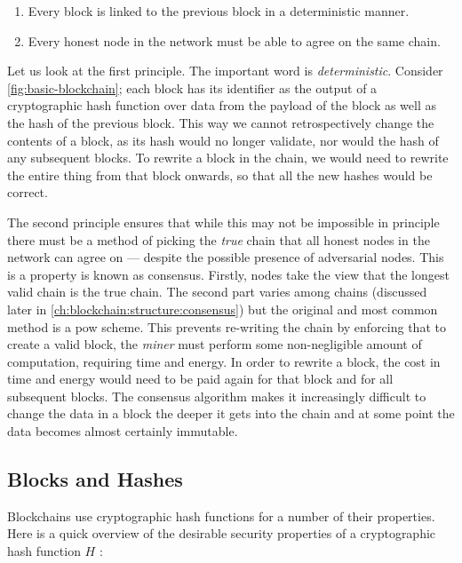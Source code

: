 \begin{enumerate}
    \item Every block is linked to the previous block in a deterministic manner.
    \item Every honest node in the network must be able to agree on the same chain.
\end{enumerate}

Let us look at the first principle. The important word is \emph{deterministic}. Consider \autoref{fig:basic-blockchain}; each block has its identifier as the output of a cryptographic hash function over data from the payload of the block as well as the hash of the previous block. This way we cannot retrospectively change the contents of a block, as its hash would no longer validate, nor would the hash of any subsequent blocks. To rewrite a block in the chain, we would need to rewrite the entire thing from that block onwards, so that all the new hashes would be correct.

The second principle ensures that while this may not be impossible in principle there must be a method of picking the \emph{true} chain that all honest nodes in the network can agree on --- despite the possible presence of adversarial nodes. This is a property is known as consensus. Firstly, nodes take the view that the longest valid chain is the true chain. The second part varies among chains (discussed later in \autoref{ch:blockchain:structure:consensus}) but the original and most common method is a \gls{pow} scheme. This prevents re-writing the chain by enforcing that to create a valid block, the \emph{miner} must perform some non-negligible amount of computation, requiring time and energy. In order to rewrite a block, the cost in time and energy would need to be paid again for that block and for all subsequent blocks. The consensus algorithm makes it increasingly difficult to change the data in a block the deeper it gets into the chain and at some point the data becomes almost certainly immutable.

\subsection{Blocks and Hashes}
\label{ch:blockchain:structure:basics}

Blockchains use cryptographic hash functions for a number of their properties. Here is a quick overview of the desirable security properties of a cryptographic hash function $H$ \cite{martinEverydayCryptography2017}:

